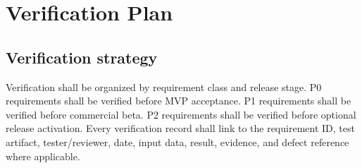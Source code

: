 \documentclass[11pt,a4paper]{article}
\begin{document}
\section{Verification Plan}

\subsection{Verification strategy}
Verification shall be organized by requirement class and release stage. P0 requirements shall be verified before MVP acceptance. P1 requirements shall be verified before commercial beta. P2 requirements shall be verified before optional release activation. Every verification record shall link to the requirement ID, test artifact, tester/reviewer, date, input data, result, evidence, and defect reference where applicable.
\end{document}
